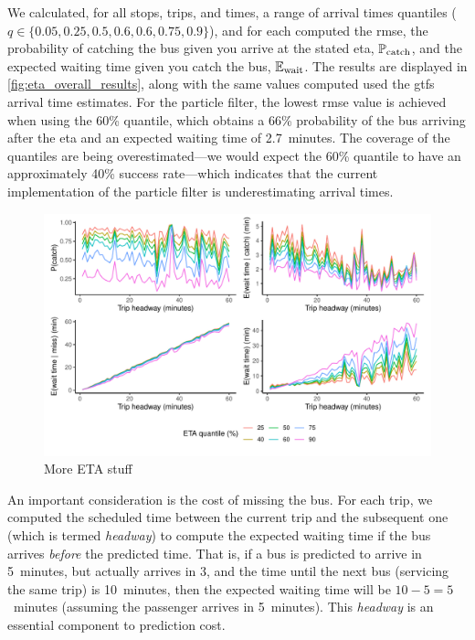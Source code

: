 We calculated, for all stops, trips, and times, a range of arrival times quantiles ($q \in \{0.05, 0.25, 0.5, 0.6, 0.6, 0.75, 0.9\}$), and for each computed the \gls{rmse}, the probability of catching the bus given you arrive at the stated \gls{eta}, $\mathbb{P}_\text{catch}$, and the expected waiting time given you catch the bus, $\mathbb{E}_\text{wait}$. The results are displayed in \cref{fig:eta_overall_results}, along with the same values computed used the \gls{gtfs} arrival time estimates. For the particle filter, the lowest \gls{rmse} value is achieved when using the 60\% quantile, which obtains a 66\% probability of the bus arriving after the \gls{eta} and an expected waiting time of 2.7~minutes. The coverage of the quantiles are being overestimated---we would expect the 60\% quantile to have an approximately 40\% success rate---which indicates that the current implementation of the particle filter is underestimating arrival times.


\begin{knitrout}\small
{}\color{fgcolor}\begin{figure}

{\centering \includegraphics[width=\textwidth]{figure/eta_headway_results-1} 

}

\caption[More ETA stuff]{More ETA stuff}\label{fig:eta_headway_results}
\end{figure}


\end{knitrout}

An important consideration is the cost of missing the bus. For each trip, we computed the scheduled time between the current trip and the subsequent one (which is termed \emph{headway}) to compute the expected waiting time if the bus arrives \emph{before} the predicted time. That is, if a bus is predicted to arrive in 5~minutes, but actually arrives in 3, and the time until the next bus (servicing the same trip) is 10~minutes, then the expected waiting time will be $10-5=5$~minutes (assuming the passenger arrives in 5~minutes). This \emph{headway} is an essential component to prediction cost.

